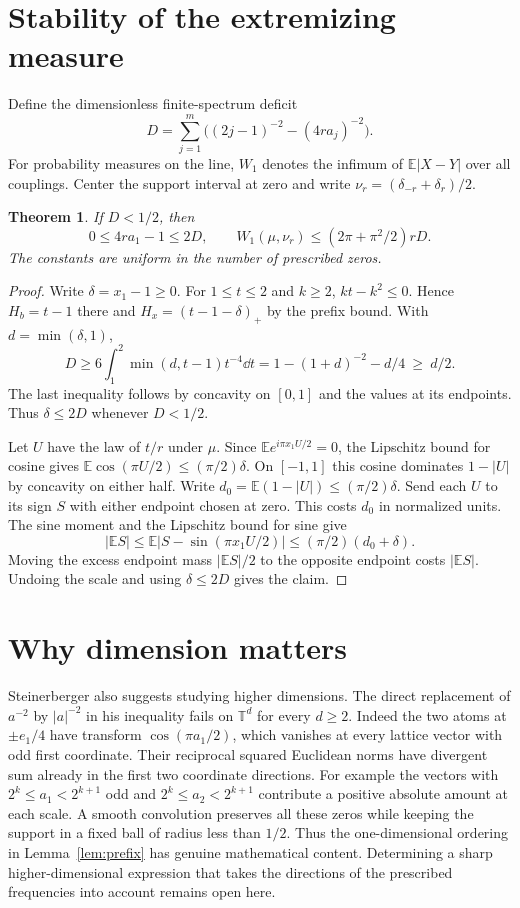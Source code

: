 \documentclass[11pt]{article}
\newtheorem{theorem}{Theorem}
\begin{document}
\section{Stability of the extremizing measure}
Define the dimensionless finite-spectrum deficit
\[
 D=\sum_{j=1}^m\bigl((2j-1)^{-2}-(4r a_j)^{-2}\bigr).
\]
For probability measures on the line, $W_1$ denotes the infimum of $\mathbb E|X-Y|$ over all couplings. Center the support interval at zero and write $\nu_r=(\delta_{-r}+\delta_r)/2$.
\begin{theorem}\label{thm:stab}
If $D<1/2$, then
\[
 0\le4r a_1-1\le 2D,\qquad
 W_1(\mu,\nu_r)\le (2\pi+\pi^2/2)rD .
\]
The constants are uniform in the number of prescribed zeros.
\end{theorem}
\begin{proof}
Write $\delta=x_1-1\ge0$. For $1\le t\le 2$ and $k\ge2$, $kt-k^2\le0$. Hence $H_b=t-1$ there and $H_x=(t-1-\delta)_+$ by the prefix bound. With $d=\min(\delta,1)$,
\[
 D\ge 6\int_1^2\min(d,t-1)t^{-4}\dd t
       =1-(1+d)^{-2}-d/4\ \ge\ d/2.
\]
The last inequality follows by concavity on $[0,1]$ and the values at its endpoints. Thus $\delta\le2D$ whenever $D<1/2$.

Let $U$ have the law of $t/r$ under $\mu$. Since $\mathbb E e^{i\pi x_1 U/2}=0$, the Lipschitz bound for cosine gives $\mathbb E\cos(\pi U/2)\le(\pi/2)\delta$. On $[-1,1]$ this cosine dominates $1-|U|$ by concavity on either half. Write $d_0=\mathbb E(1-|U|)\le(\pi/2)\delta$. Send each $U$ to its sign $S$ with either endpoint chosen at zero. This costs $d_0$ in normalized units. The sine moment and the Lipschitz bound for sine give
\[
 |\mathbb E S|\le \mathbb E\big|S-\sin(\pi x_1 U/2)\big|
                 \le (\pi/2)(d_0+\delta).
\]
Moving the excess endpoint mass $|\mathbb E S|/2$ to the opposite endpoint costs $|\mathbb E S|$. Undoing the scale and using $\delta\le2D$ gives the claim.
\end{proof}

\section{Why dimension matters}
Steinerberger also suggests studying higher dimensions. The direct replacement of $a^{-2}$ by $|a|^{-2}$ in his inequality fails on $\mathbb T^d$ for every $d\ge2$. Indeed the two atoms at $\pm e_1/4$ have transform $\cos(\pi a_1/2)$, which vanishes at every lattice vector with odd first coordinate. Their reciprocal squared Euclidean norms have divergent sum already in the first two coordinate directions. For example the vectors with $2^k\le a_1<2^{k+1}$ odd and $2^k\le a_2<2^{k+1}$ contribute a positive absolute amount at each scale. A smooth convolution preserves all these zeros while keeping the support in a fixed ball of radius less than $1/2$. Thus the one-dimensional ordering in Lemma~\ref{lem:prefix} has genuine mathematical content. Determining a sharp higher-dimensional expression that takes the directions of the prescribed frequencies into account remains open here.
\end{document}
